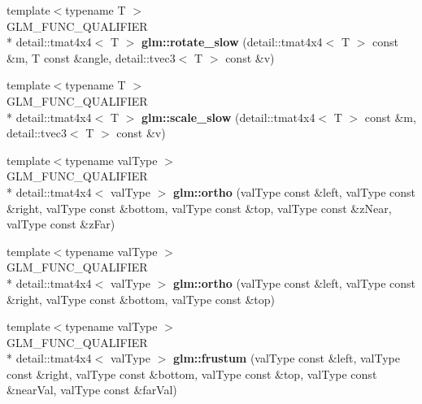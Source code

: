 \begin{DoxyCompactItemize}
\item 
\hypertarget{namespaceglm_ac9cf508a8aafbe789407ceedc8bba577}{{\footnotesize template$<$typename T $>$ }\\G\-L\-M\-\_\-\-F\-U\-N\-C\-\_\-\-Q\-U\-A\-L\-I\-F\-I\-E\-R \\*
detail\-::tmat4x4$<$ T $>$ {\bfseries glm\-::rotate\-\_\-slow} (detail\-::tmat4x4$<$ T $>$ const \&m, T const \&angle, detail\-::tvec3$<$ T $>$ const \&v)}\label{namespaceglm_ac9cf508a8aafbe789407ceedc8bba577}

\item 
\hypertarget{namespaceglm_a76d77fa87fa61d2f5fe7d103d13fb8da}{{\footnotesize template$<$typename T $>$ }\\G\-L\-M\-\_\-\-F\-U\-N\-C\-\_\-\-Q\-U\-A\-L\-I\-F\-I\-E\-R \\*
detail\-::tmat4x4$<$ T $>$ {\bfseries glm\-::scale\-\_\-slow} (detail\-::tmat4x4$<$ T $>$ const \&m, detail\-::tvec3$<$ T $>$ const \&v)}\label{namespaceglm_a76d77fa87fa61d2f5fe7d103d13fb8da}

\item 
\hypertarget{namespaceglm_acc52ed471fb6f5c9ba9c548c0f2e818e}{{\footnotesize template$<$typename val\-Type $>$ }\\G\-L\-M\-\_\-\-F\-U\-N\-C\-\_\-\-Q\-U\-A\-L\-I\-F\-I\-E\-R \\*
detail\-::tmat4x4$<$ val\-Type $>$ {\bfseries glm\-::ortho} (val\-Type const \&left, val\-Type const \&right, val\-Type const \&bottom, val\-Type const \&top, val\-Type const \&z\-Near, val\-Type const \&z\-Far)}\label{namespaceglm_acc52ed471fb6f5c9ba9c548c0f2e818e}

\item 
\hypertarget{namespaceglm_a3add8e024acb8ca1151c68e03bbb0c1c}{{\footnotesize template$<$typename val\-Type $>$ }\\G\-L\-M\-\_\-\-F\-U\-N\-C\-\_\-\-Q\-U\-A\-L\-I\-F\-I\-E\-R \\*
detail\-::tmat4x4$<$ val\-Type $>$ {\bfseries glm\-::ortho} (val\-Type const \&left, val\-Type const \&right, val\-Type const \&bottom, val\-Type const \&top)}\label{namespaceglm_a3add8e024acb8ca1151c68e03bbb0c1c}

\item 
\hypertarget{namespaceglm_a8baf5656c3afcb2e3ebcc34c542610a4}{{\footnotesize template$<$typename val\-Type $>$ }\\G\-L\-M\-\_\-\-F\-U\-N\-C\-\_\-\-Q\-U\-A\-L\-I\-F\-I\-E\-R \\*
detail\-::tmat4x4$<$ val\-Type $>$ {\bfseries glm\-::frustum} (val\-Type const \&left, val\-Type const \&right, val\-Type const \&bottom, val\-Type const \&top, val\-Type const \&near\-Val, val\-Type const \&far\-Val)}\label{namespaceglm_a8baf5656c3afcb2e3ebcc34c542610a4}


\end{DoxyCompactItemize}
